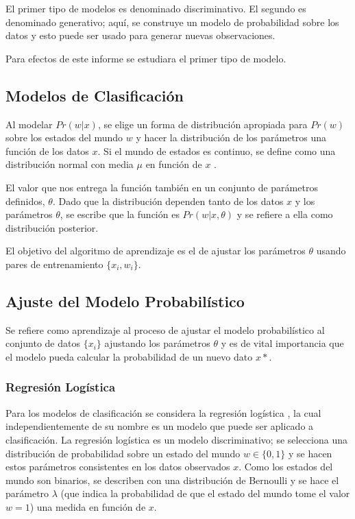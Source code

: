 \documentclass[letter,12pt]{report}
\begin{document}
El primer tipo de modelos es denominado discriminativo. El segundo es denominado
generativo; aquí, se construye un modelo de probabilidad sobre los datos y esto puede ser
usado para generar nuevas observaciones.

Para efectos de este informe se estudiara el primer tipo de modelo.

\subsection{Modelos de Clasificación}
Al modelar $Pr(w|x)$, se elige un forma de distribución apropiada para $Pr(w)$ sobre los
estados del mundo $w$ y hacer la distribución de los parámetros una función de los datos
$x$. Si el mundo de estados es continuo, se define como una distribución normal con
media $\mu$ en función de $x$ \cite{MLClass}.

El valor que nos entrega la función también en un conjunto de parámetros definidos,
$\theta$. Dado que la distribución dependen tanto de los datos $x$ y los parámetros
$\theta$, se escribe que la función es $Pr(w|x, \theta)$ y se refiere a ella como
distribución posterior.

El objetivo del algoritmo de aprendizaje es el de ajustar los parámetros $\theta$ usando
pares de entrenamiento $\{x_i, w_i\}$.

\subsection{Ajuste del Modelo Probabilístico}
Se refiere como aprendizaje al proceso de ajustar el modelo probabilístico al conjunto
de datos $\{x_i\}$ ajustando los parámetros $\theta$ y es de vital importancia que el
modelo pueda calcular la probabilidad de un nuevo dato $x*$\cite{Probab}.

\subsubsection{Regresión Logística}
Para los modelos de clasificación se considera la regresión logística \cite{LogicR}, la cual
independientemente de su nombre es un modelo que puede ser aplicado a clasificación. La
regresión logística es un modelo  discriminativo; se selecciona una distribución
de probabilidad sobre un estado del mundo $w \in \{0, 1\}$ y se hacen estos parámetros
consistentes en los datos observados $x$. Como los estados del mundo son binarios,
se describen con una distribución de Bernoulli y se hace el parámetro $\lambda$ (que
indica la probabilidad de que el estado del mundo tome el valor $w=1$) una medida en
función de $x$.
\end{document}
